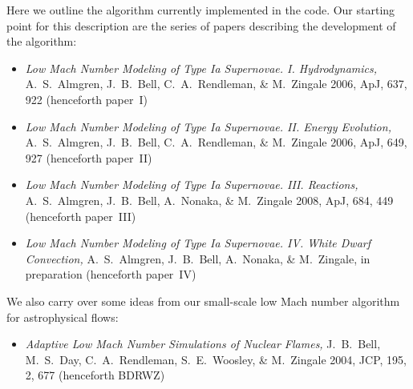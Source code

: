 Here we outline the algorithm currently implemented in the code.  Our
starting point for this description are the series of papers describing
the development of the algorithm:
\begin{itemize}
\item {\em Low Mach Number Modeling of Type Ia
  Supernovae. I. Hydrodynamics,} A.~S.~Almgren, J.~B.~Bell, 
  C.~A.~Rendleman, \& M.~Zingale 2006, ApJ, 637, 922 (henceforth
  paper~I)
\item {\em Low Mach Number Modeling of Type Ia Supernovae. II. Energy
  Evolution,} A.~S.~Almgren, J.~B.~Bell, C.~A.~Rendleman, \& M.~Zingale
  2006, ApJ, 649, 927 (henceforth paper~II)\item {\em Low Mach Number Modeling of Type Ia Supernovae. III. Reactions,}
A.~S.~Almgren, J.~B.~Bell, A.~Nonaka, \& M.~Zingale
  2008, ApJ, 684, 449 (henceforth paper~III)
\item {\em Low Mach Number Modeling of Type Ia Supernovae. IV. White Dwarf Convection,}
A.~S.~Almgren, J.~B.~Bell, A.~Nonaka, \& M.~Zingale,
  in preparation (henceforth paper~IV)
\end{itemize}
We also carry over some ideas from our small-scale low Mach number algorithm
for astrophysical flows:
\begin{itemize}
\item {\em Adaptive Low Mach Number Simulations of Nuclear Flames,}
J.~B.~Bell, M.~S.~Day, C.~A.~Rendleman, S.~E.~Woosley, \& M.~Zingale
2004, JCP, 195, 2, 677 (henceforth BDRWZ)
\end{itemize}

